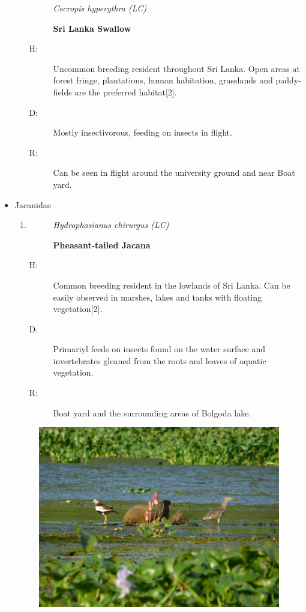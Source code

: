 \begin{itemize}
\begin{enumerate}
\begin{description}%
\item[]%
\textit{Cecropis hyperythra (LC)}%
\item[]%
\textbf{Sri Lanka Swallow}%
\end{description}%
\begin{description}%
\item[H: ]%
Uncommon breeding resident throughout Sri Lanka. Open areas at forest fringe, plantations, human habitation, grasslands and paddy-fields are the preferred habitat{[}2{]}.%
\item[D: ]%
Mostly insectivorous, feeding on insects in flight.%
\item[R: ]%
Can be seen in flight around the university ground and near Boat yard.%
\end{description}%
\end{enumerate}%
\item%
Jacanidae%
\begin{enumerate}%
\item%
\begin{description}%
\item[]%
\textit{Hydrophasianus chirurgus (LC)}%
\item[]%
\textbf{Pheasant{-}tailed Jacana}%
\end{description}%
\begin{description}%
\item[H: ]%
Common breeding resident in the lowlands of Sri Lanka. Can be easily observed in marshes, lakes and tanks with floating vegetation{[}2{]}.%
\item[D: ]%
Primariyl feeds on insects found on the water surface and invertebrates gleaned from the roots and leaves of aquatic vegetation.%
\item[R: ]%
Boat yard and the surrounding areas of Bolgoda lake.\newline
\newline\newline\newline%
\end{description}%
\end{enumerate}%
\begin{figure}[!htpb]
    \centering
    \includegraphics[width=\linewidth]{Figures/scenery.JPG}

\end{figure}
\end{itemize}
